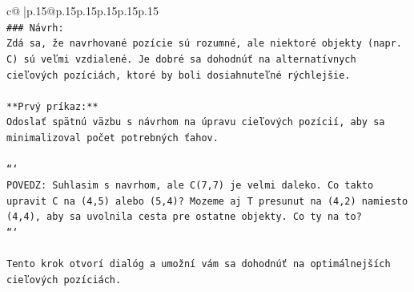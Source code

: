 \documentclass{article}
\begin{document}
{\begin{supertabular}{c@{$\;$}|p{.15\linewidth}@{}p{.15\linewidth}p{.15\linewidth}p{.15\linewidth}p{.15\linewidth}p{.15\linewidth}}
{{{\\ 
\texttt{\#\#\# Návrh:} \\
\texttt{Zdá sa, že navrhované pozície sú rozumné, ale niektoré objekty (napr. C) sú veľmi vzdialené. Je dobré sa dohodnúť na alternatívnych cieľových pozíciách, ktoré by boli dosiahnuteľné rýchlejšie.} \\
\\ 
\texttt{**Prvý príkaz:**} \\
\texttt{Odoslať spätnú väzbu s návrhom na úpravu cieľových pozícií, aby sa minimalizoval počet potrebných ťahov.} \\
\\ 
\texttt{```} \\
\texttt{POVEDZ: Suhlasim s navrhom, ale C(7,7) je velmi daleko. Co takto upravit C na (4,5) alebo (5,4)? Mozeme aj T presunut na (4,2) namiesto (4,4), aby sa uvolnila cesta pre ostatne objekty. Co ty na to?} \\
\texttt{```} \\
\\ 
\texttt{Tento krok otvorí dialóg a umožní vám sa dohodnúť na optimálnejších cieľových pozíciách.} \\
            }
        }
    }
     \\ \\


\end{supertabular}}
\end{document}
